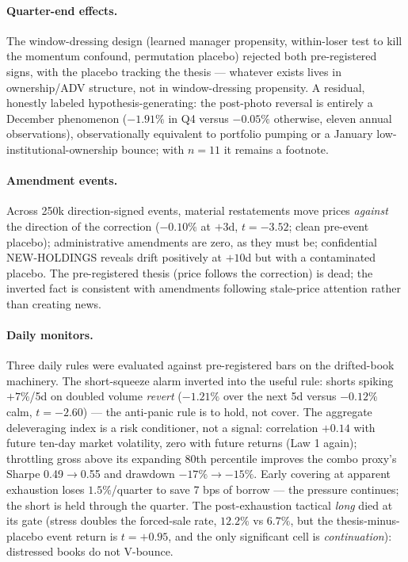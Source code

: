 \paragraph{Quarter-end effects.}
The window-dressing design (learned manager propensity, within-loser
test to kill the momentum confound, permutation placebo) rejected
both pre-registered signs, with the placebo tracking the thesis ---
whatever exists lives in ownership/ADV structure, not in
window-dressing propensity. A residual, honestly labeled
hypothesis-generating: the post-photo reversal is entirely a
December phenomenon ($-1.91\%$ in Q4 versus $-0.05\%$ otherwise,
eleven annual observations), observationally equivalent to
portfolio pumping \citep{carhart2002} or a January
low-institutional-ownership bounce; with $n=11$ it remains a
footnote.

\paragraph{Amendment events.}
Across 250k direction-signed events, material restatements move
prices \emph{against} the direction of the correction
($-0.10\%$ at $+3$d, $t=-3.52$; clean pre-event placebo);
administrative amendments are zero, as they must be; confidential
NEW-HOLDINGS reveals drift positively at $+10$d but with a
contaminated placebo. The pre-registered thesis (price follows the
correction) is dead; the inverted fact is consistent with amendments
following stale-price attention rather than creating news.

\paragraph{Daily monitors.}
Three daily rules were evaluated against pre-registered bars on the
drifted-book machinery. The short-squeeze alarm inverted into the
useful rule: shorts spiking $+7\%$/5d on doubled volume
\emph{revert} ($-1.21\%$ over the next 5d versus $-0.12\%$ calm,
$t=-2.60$) --- the anti-panic rule is to hold, not cover.
The aggregate deleveraging index is a risk conditioner, not a
signal: correlation $+0.14$ with future ten-day market volatility,
zero with future returns (Law 1 again); throttling gross above its
expanding 80th percentile improves the combo proxy's Sharpe
0.49$\to$0.55 and drawdown $-17\%\to-15\%$. Early covering at
apparent exhaustion loses $1.5\%$/quarter to save 7 bps of borrow
--- the pressure continues; the short is held through the quarter.
The post-exhaustion tactical \emph{long} died at its gate
(stress doubles the forced-sale rate, $12.2\%$ vs $6.7\%$, but the
thesis-minus-placebo event return is $t=+0.95$, and the only
significant cell is \emph{continuation}): distressed books do not
V-bounce.
